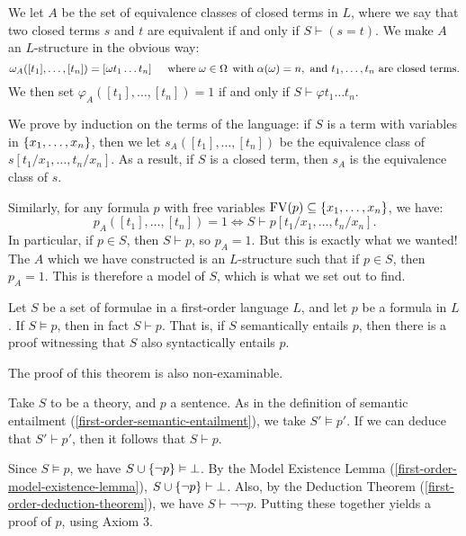 \documentclass{article}
\begin{document}
\begin{prf}
	We let $A$ be the set of equivalence classes of closed terms in $L$, where we say that two closed terms $s$ and $t$ are equivalent if and only if $S \vdash (s=t)$. We make $A$ an $L$-structure in the obvious way:
	\[
	\omega_A([t_1], \dots, [t_n]) = [\omega t_1 \dots t_n]
	\quad \mathrel{\, \text{where}} \omega \in \Omega \mathrel{\, \text{with}} \alpha(\omega) = n,
	\text{ and } t_1, \dots, t_n \text{ are closed terms}.
	\]
	We then set $\varphi_A([t_1], \dots, [t_n]) = 1$ if and only if $S \vdash \varphi t_1 \dots t_n$.
	
	We prove by induction on the terms of the language: if $S$ is a term with variables in $\left\lbrace x_1, \dots, x_n \right\rbrace$, then we let $s_A([t_1], \dots, [t_n])$ be the equivalence class of $s[t_1/x_1, \dots, t_n/x_n]$. As a result, if $S$ is a closed term, then $s_A$ is the equivalence class of $s$.
	
	Similarly, for any formula $p$ with free variables $\mathrm{FV}(p) \subseteq \left\lbrace x_1, \dots, x_n \right\rbrace$, we have:
	\[
	p_A([t_1], \dots, [t_n]) = 1 \iff S \vdash p[t_1/x_1, \dots, t_n/x_n].
	\]
	In particular, if $p \in S$, then $S \vdash p$, so $p_A = 1$. But this is exactly what we wanted! The $A$ which we have constructed is an $L$-structure such that if $p \in S$, then $p_A = 1$. This is therefore a model of $S$, which is what we set out to find.
\end{prf}

\begin{theorem}
	\label{first-order-adequacy-theorem}
    Let $S$ be a set of formulae in a first-order language $L$, and let $p$ be a formula in $L$. If $S \vDash p$, then in fact $S \vdash p$. That is, if $S$ semantically entails $p$, then there is a proof witnessing that $S$ also syntactically entails $p$.
\end{theorem}

\begin{note}
	The proof of this theorem is also non-examinable.
\end{note}

\begin{prf}
    Take $S$ to be a theory, and $p$ a sentence. As in the definition of semantic entailment (\ref{first-order-semantic-entailment}), we take $S' \vDash p'$. If we can deduce that $S' \vdash p'$, then it follows that $S \vdash p$.
    
    Since $S \vDash p$, we have $S \cup \left\lbrace \lnot p \right\rbrace \vDash \bot$. By the Model Existence Lemma (\ref{first-order-model-existence-lemma}), $S \cup \left\lbrace \lnot p \right\rbrace \vdash \bot$. Also, by the Deduction Theorem (\ref{first-order-deduction-theorem}), we have $S \vdash \lnot\lnot p$. Putting these together yields a proof of $p$, using Axiom 3.
\end{prf}
\end{document}
